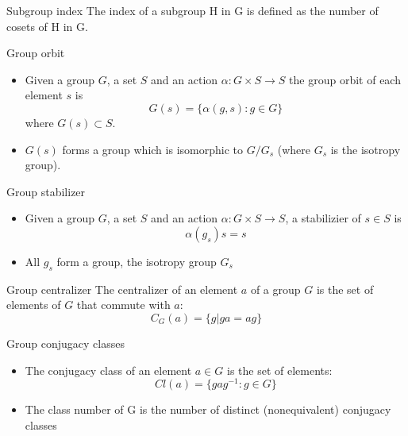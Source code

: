 \documentclass[presentation]{beamer}
\begin{document}
\begin{frame}[label={sec:org3c8e464}]{Subgroup index}
The index of a subgroup H in G is defined as the number of cosets of H in G.
\end{frame}

\begin{frame}[label={sec:orgdeacb1c}]{Group orbit}
\begin{itemize}
\item Given a group \(G\), a set \(S\) and an action \(\alpha: G \times S \rightarrow
      S\) the group orbit of each element \(s\) is $$G(s) = \{ \alpha(g, s) : g \in
      G \}$$ where \(G(s) \subset S\).
\item \(G(s)\) forms a group which is isomorphic to \(G/G_s\) (where \(G_s\) is the
isotropy group).
\end{itemize}
\end{frame}
\begin{frame}[label={sec:org70307ec}]{Group stabilizer}
\begin{itemize}
\item Given a group \(G\), a set \(S\) and an action \(\alpha: G \times S \rightarrow S\),
a stabilizier of \(s \in S\) is $$\alpha(g_s) s = s$$

\item All \(g_s\) form a group, the \alert{isotropy group} \(G_s\)
\end{itemize}
\end{frame}

\begin{frame}[label={sec:org06b3ee3}]{Group centralizer}
The centralizer of an element \(a\) of a group \(G\) is the set of elements of
\(G\) that commute with \(a\): $$C_G(a) = \{ g \vert ga = ag \}$$
\end{frame}

\begin{frame}[label={sec:orgff2603e}]{Group conjugacy classes}
\begin{itemize}
\item The conjugacy class of an element \(a \in G\) is the set of elements:
$$Cl(a) = \{ gag^{-1}: g \in G \}$$

\item The class number of G is the number of distinct (nonequivalent) conjugacy classes
\end{itemize}
\end{frame}
\end{document}

